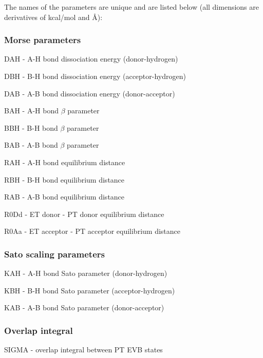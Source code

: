 \documentclass[oneside,11pt,openany]{book}
\newcommand{\tw}{\ttfamily}
\begin{document}
\noindent The names of the parameters are unique and are
listed below (all dimensions are derivatives of kcal/mol and \AA):

\subsubsection*{Morse parameters}
\begin{description}
\item {\tw DAH} - A-H bond dissociation energy (donor-hydrogen)
\item {\tw DBH} - B-H bond dissociation energy (acceptor-hydrogen)
\item {\tw DAB} - A-B bond dissociation energy (donor-acceptor)
\item {\tw BAH} - A-H bond $\beta$ parameter
\item {\tw BBH} - B-H bond $\beta$ parameter
\item {\tw BAB} - A-B bond $\beta$ parameter
\item {\tw RAH} - A-H bond equilibrium distance
\item {\tw RBH} - B-H bond equilibrium distance
\item {\tw RAB} - A-B bond equilibrium distance
\item {\tw R0Dd} - ET donor - PT donor equilibrium distance
\item {\tw R0Aa} - ET acceptor - PT acceptor equilibrium distance
\end{description}

\subsubsection*{Sato scaling parameters}
\begin{description}
\item {\tw KAH} - A-H bond Sato parameter (donor-hydrogen)
\item {\tw KBH} - B-H bond Sato parameter (acceptor-hydrogen)
\item {\tw KAB} - A-B bond Sato parameter (donor-acceptor)
\end{description}

\subsubsection*{Overlap integral}
\begin{description}
\item {\tw SIGMA} - overlap integral between PT EVB states
\end{description}
\end{document}

